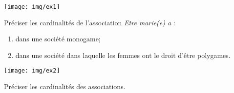 \documentclass[a4paper,12pt,french]{book}
\begin{document}

\begin{exercice}[]
\begin{center}
\texttt{[image: img/ex1]}
\end{center}
Préciser les cardinalités de l'association \textit{Etre marie(e) a} :
\begin{enumerate}[--]
	\item 	dans une société monogame;
	\item 	dans une société dans laquelle les femmes ont le droit d'être polygames.
\end{enumerate}
\end{exercice}

\begin{exercice}[]
\begin{center}
\texttt{[image: img/ex2]}
\end{center}
Préciser les cardinalités des associations.
\end{exercice}
\newpage
\end{document}
